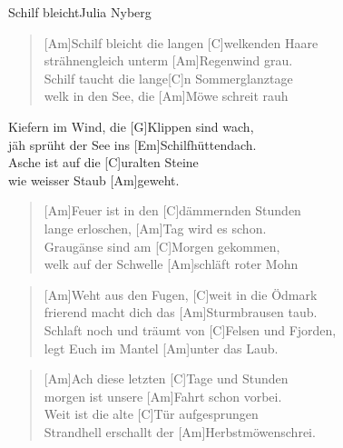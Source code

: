 \begin{song}{Schilf bleicht}{Julia Nyberg}

    \begin{verse}  
        [Am]Schilf bleicht die langen [C]welkenden Haare \\
        [Em]strähnengleich unterm [Am]Regenwind grau. \\
        [Am]Schilf taucht die lange[C]n Sommerglanztage \\
        [Em]welk in den See, die [Am]Möwe schreit rauh
    \end{verse}  

    \begin{chorus}
        [C]Kiefern im Wind, die [G]Klippen sind wach, \\
        [Am]jäh sprüht der See ins [Em]Schilfhüttendach. \\
        [Am]Asche ist auf die [C]uralten Steine \\
        [Em]wie weisser Staub [Am]geweht.
    \end{chorus}

    \begin{verse}  
        [Am]Feuer ist in den [C]dämmernden Stunden \\
        [Em]lange erloschen, [Am]Tag wird es schon. \\
        [Am]Graugänse sind am [C]Morgen gekommen, \\
        [Em]welk auf der Schwelle [Am]schläft roter Mohn
    \end{verse}  


    \begin{verse}  
        [Am]Weht aus den Fugen, [C]weit in die Ödmark \\
        [Em]frierend macht dich das [Am]Sturmbrausen taub. \\
        [Am]Schlaft noch und träumt von [C]Felsen und Fjorden, \\
        [Em]legt Euch im Mantel [Am]unter das Laub.
    \end{verse}  


    \begin{verse}  
        [Am]Ach diese letzten [C]Tage und Stunden \\
        [Em]morgen ist unsere [Am]Fahrt schon vorbei. \\
        [Am]Weit ist die alte [C]Tür aufgesprungen \\
        [Em]Strandhell erschallt der [Am]Herbstmöwenschrei.
    \end{verse}  


\end{song}
